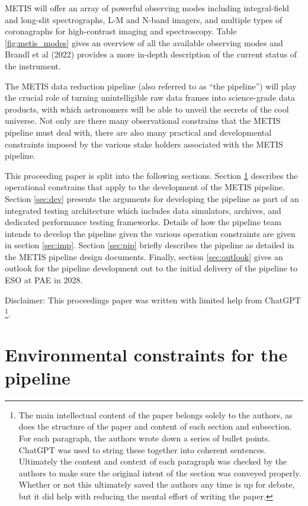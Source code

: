 \documentclass[a4paper]{spie}  %
\begin{document}

METIS will offer an array of powerful observing modes including integral-field and long-slit spectrographs, L-M and N-band imagers, and multiple types of coronagraphs for high-contrast imaging and spectroscopy.
Table \ref{fig:metis_modes} gives an overview of all the available observing modes and Brandl et al (2022) \cite{metis_spie_2022} provides a more in-depth description of the current status of the instrument. 

The METIS data reduction pipeline (also referred to as ``the pipeline'') will play the crucial role of turning unintelligible raw data frames into science-grade data products, with which astronomers will be able to unveil the secrets of the cool universe.
Not only are there many observational constrains that the METIS pipeline must deal with, there are also many practical and developmental constraints imposed by the various stake holders associated with the METIS pipeline. 

This proceeding paper is split into the following sections. Section \ref{sec:env} describes the operational constrains that apply to the development of the METIS pipeline. Section \ref{sec:dev} presents the arguments for developing the pipeline as part of an integrated testing architecture which includes data simulators, archives, and dedicated performance testing frameworks. Details of how the pipeline team intends to develop the pipeline given the various operation constraints are given in section \ref{sec:imp}. Section \ref{sec:pip} briefly describes the pipeline as detailed in the METIS pipeline design documents. Finally, section \ref{sec:outlook} gives an outlook for the pipeline development out to the initial delivery of the pipeline to ESO at PAE in 2028.

Disclaimer: This proceedings paper was written with limited help from ChatGPT \footnote{The main intellectual content of the paper belongs solely to the authors, as does the structure of the paper and content of each section and subsection. For each paragraph, the authors wrote down a series of bullet points. ChatGPT was used to string these together into coherent sentences. Ultimately the content and context of each paragraph was checked by the authors to make sure the original intent of the section was conveyed properly. Whether or not this ultimately saved the authors any time is up for debate, but it did help with reducing the mental effort of writing the paper.}.

\section{Environmental constraints for the pipeline}
\label{sec:env}
\end{document}

